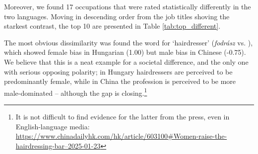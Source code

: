 \documentclass[11pt]{article}
\newcommand{\zh}[1]{\simplifiedchinesefont{#1}\rmfamily}
\begin{document}


Moreover, we found 17 occupations that were rated statistically differently in the two languages. Moving in descending order from the job titles shoving the starkest contrast, the top 10 are presented in Table \ref{tab:top_different}.

The most obvious dissimilarity was found the word for `hairdresser' (\textit{fodrász} vs. \zh{理发师}), which showed female bias in Hungarian (1.00) but male bias in Chinese (-0.75). We believe that this is a neat example for a societal difference, and the only one with serious opposing polarity; in Hungary hairdressers are perceived to be predominantly female, while in China the profession is perceived to be more male-dominated -- although the gap is closing.\footnote{It is not difficult to find evidence for the latter from the press, even in English-language media: \href{https://www.chinadailyhk.com/hk/article/603100\#Women-raise-the-hairdressing-bar--2025-01-23}{https://www.chinadailyhk.com/hk/article/603100\#Women-raise-the-hairdressing-bar--2025-01-23}}
\end{document}
